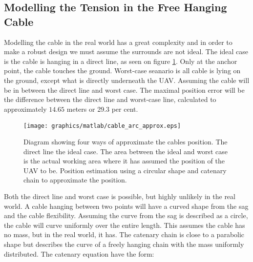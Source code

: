    

\subsection{Modelling the Tension in the Free Hanging Cable}
Modelling the cable in the real world has a great complexity and in order to make a robust design we must assume the surrounds are not ideal. The ideal case is the cable is hanging in a direct line, as seen on figure \ref{fig:cable_model_cases}. Only at the anchor point, the cable touches the ground. Worst-case seanario is all cable is lying on the ground, except what is directly underneath the UAV. Assuming the cable will be in between the direct line and worst case. The maximal position error will be the difference between the direct line and worst-case line, calculated to approximately $14.65$ meters or 29.3 per cent.

\begin{figure}[H]
\centering
\texttt{[image: graphics/matlab/cable\_arc\_approx.eps]}
\caption[Diagram showing 4 ways of approximate the cables position.]{Diagram showing four ways of approximate the cables position. The direct line the ideal case. The area between the ideal and worst case is the actual working area where it has assumed the position of the UAV to be. Position estimation using a circular shape and catenary chain to approximate the position.}
\label{fig:cable_model_cases}
\end{figure}

\noindent
Both the direct line and worst case is possible, but highly unlikely in the real world. A cable hanging between two points will have a curved shape from the sag and the cable flexibility. Assuming the curve from the sag is described as a circle, the cable will curve uniformly over the entire length. This assumes the cable has no mass, but in the real world, it has.
The catenary chain is close to a parabolic shape but describes the curve of a freely hanging chain with the mass uniformly distributed\cite{Whewelll1833}. The catenary equation have the form:

